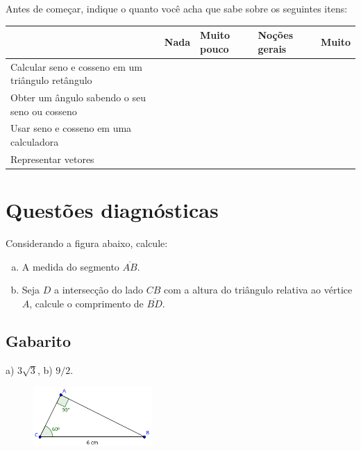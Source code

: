 \documentclass[main.tex]{subfiles}
\begin{document}
Antes de começar, indique o quanto você acha que sabe sobre os seguintes itens:

\begin{center}
 \begin{tabular}{|p{25mm}||p{10mm}|p{10mm}|p{10mm}|p{10mm}|} 
 \hline
   & Nada & Muito pouco & Noções gerais & Muito\\
 \hline
 Calcular seno e cosseno em um triângulo retângulo &  &  &  &  \\ 
 \hline
 Obter um ângulo sabendo o seu seno ou cosseno &  &  &  &  \\
 \hline
 Usar seno e cosseno em uma calculadora &  &  &  &  \\
 \hline
 Representar vetores &  &  &  &  \\
 \hline
\end{tabular}
\end{center}

\section{Questões diagnósticas}

\begin{diagnostico}
Considerando a figura abaixo, calcule:
\begin{enumerate}[a)]
  \item A medida do segmento $\overline{AB}$.
  \item Seja $D$ a intersecção do lado $CB$ com a altura do triângulo relativa ao vértice $A$, calcule o comprimento de $\overline{BD}$.
\end{enumerate}
\end{diagnostico}

\paraTutores

\subsection{Gabarito}

a) $3\sqrt{3}$, b) $9/2$.

\paraAmbos
 
\begin{figure}[h]
\centering
\includegraphics[width=0.4\textwidth]{./img/c4d1.png}
\end{figure}
\end{document}
